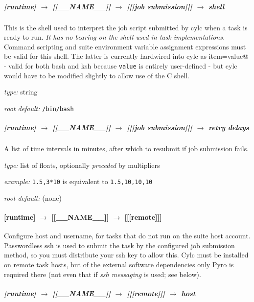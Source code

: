 \subparagraph[shell]{[runtime] $\rightarrow$ [[\_\_NAME\_\_]] $\rightarrow$ [[[job submission]]] $\rightarrow$ shell}
\label{JobSubShell}

This is the shell used to interpret the job script submitted by cylc
when a task is ready to run.  {\em It has no bearing on the shell used
in task implementations.} Command scripting and suite environment 
variable assignment expressions must be valid for this shell. The 
latter is currently hardwired into cylc as 
\lstinline@export item=value@ - valid for both bash and ksh
because \lstinline=value= is entirely user-defined - but cylc would have
to be modified slightly to allow use of the C shell.

\begin{myitemize}
\item {\em type:} string
\item {\em root default:} \lstinline=/bin/bash= 
\end{myitemize}

\subparagraph[retry delays]{[runtime] $\rightarrow$ [[\_\_NAME\_\_]] $\rightarrow$ [[[job submission]]] $\rightarrow$ retry delays}
\label{JobSubRefRetries}

A list of time intervals in minutes, after which to resubmit if job
submission fails.
\begin{myitemize}
\item {\em type:} list of floats, optionally {\em preceded} by multipliers
\item {\em example:} \lstinline=1.5,3*10= is equivalent to \lstinline=1.5,10,10,10=
\item {\em root default:} (none)
\end{myitemize}


\paragraph[{[[[}remote{]]]}]{[runtime] $\rightarrow$ [[\_\_NAME\_\_]] $\rightarrow$ [[[remote]]]}

Configure host and username, for tasks that do not run on the suite host
account. Passwordless ssh is used to submit the task by the configured
job submission method, so you must distribute your ssh key to allow
this. Cylc must be installed on remote task hosts, but of the external
software dependencies only Pyro is required there (not even that if {\em
ssh messaging} is used; see below).

\subparagraph[host]{[runtime] $\rightarrow$ [[\_\_NAME\_\_]] $\rightarrow$ [[[remote]]] $\rightarrow$ host}
\label{DynamicHostSelection}

